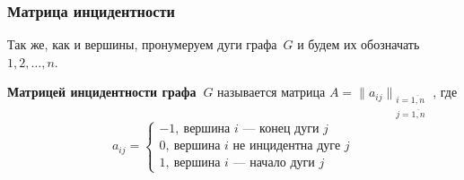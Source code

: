 \subsubsection{Матрица инцидентности}
Так же, как и вершины, пронумеруем дуги графа~$G$ и будем их обозначать $1, 2, \ldots, n$.

 \textbf{Матрицей инцидентности графа~$G$} называется матрица $A = \|a_{ij}\|_{\begin{smallmatrix}
i = \overline{1,n} \\
j = \overline{1,n}
\end{smallmatrix}}$, где
\begin{equation*}
a_{ij} =
\begin{cases}
-1, \ \text{вершина~$i$~--- конец дуги~$j$} \\
0, \ \text{вершина~$i$ не инцидентна дуге~$j$} \\
1, \ \text{вершина~$i$~--- начало дуги~$j$}
\end{cases}
\end{equation*}